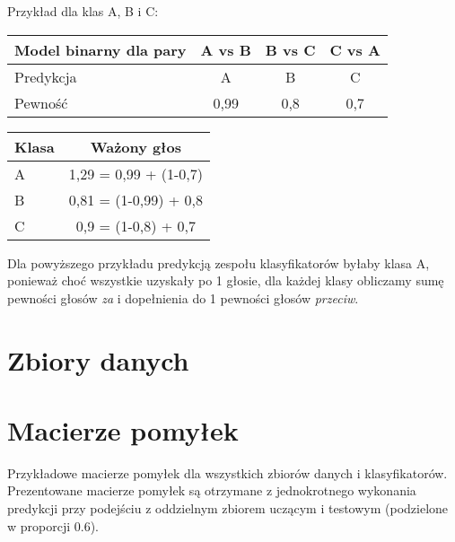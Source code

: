\documentclass{article}
\begin{document}
Przykład dla klas A, B i C:

\begin{table}[ht]
\centering
\begin{tabular}{|l|c|c|c|}
\hline
Model binarny dla pary & A vs B & B vs C & C vs A \\ \hline
Predykcja              & A      & B      & C      \\
Pewność                & 0,99   & 0,8    & 0,7    \\ \hline
\end{tabular}
\label{tab:binary-pairs}
\end{table}

\begin{table}[ht]
\centering
\begin{tabular}{|l|c|}
\hline
Klasa & Ważony głos \\ \hline
A     & 1,29 = 0,99 + (1-0,7) \\
B     & 0,81 = (1-0,99) + 0,8 \\
C     & 0,9 = (1-0,8) + 0,7 \\ \hline
\end{tabular}
\label{tab:weighted-votes}
\end{table}

Dla powyższego przykładu predykcją zespołu klasyfikatorów byłaby klasa A, ponieważ choć wszystkie uzyskały po 1 głosie,
dla każdej klasy obliczamy sumę pewności głosów \textit{za} i dopełnienia do 1 pewności głosów \textit{przeciw}.

\section{Zbiory danych}



\section{Macierze pomyłek}
Przykładowe macierze pomyłek dla wszystkich zbiorów danych i klasyfikatorów.
Prezentowane macierze pomyłek są otrzymane z jednokrotnego wykonania predykcji przy podejściu z oddzielnym zbiorem uczącym i testowym (podzielone w proporcji $0.6$).
\end{document}
